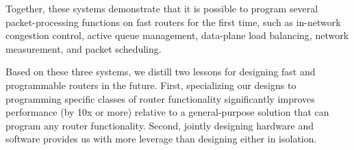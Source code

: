 Together, these systems demonstrate that it is possible to program several
packet-processing functions on fast routers for the first time, such as
in-network congestion control, active queue management, data-plane load
balancing, network measurement, and packet scheduling.

Based on these three systems, we distill two lessons for designing fast and
programmable routers in the future. First, specializing our designs to
programming specific classes of router functionality significantly improves
performance (by 10x or more) relative to a general-purpose solution that can
program any router functionality. Second, jointly designing hardware and
software provides us with more leverage than designing either in isolation.
